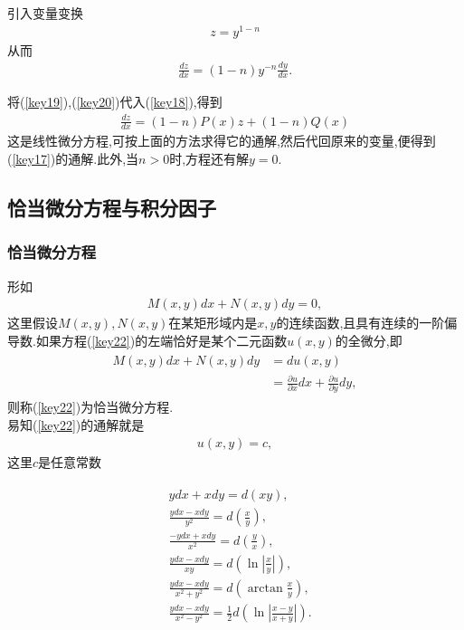 \documentclass[UTF8]{article}
\begin{document}
引入变量变换
\begin{align}\label{key19}
z=y^{1-n}
\end{align}
从而
\begin{align}\label{key20}
\frac{dz}{dx}=(1-n)y^{-n} \frac{dy}{dx}.
\end{align}

将(\ref{key19}),(\ref{key20})代入(\ref{key18}),得到
\begin{align}\label{key21}
\frac{dz}{dx}=(1-n)P(x)z+(1-n)Q(x)
\end{align}
这是线性微分方程,可按上面的方法求得它的通解,然后代回原来的变量,便得到(\ref{key17})的通解.此外,当$n>0$时,方程还有解$y=0$.

\subsection{恰当微分方程与积分因子}
\subsubsection{恰当微分方程}

形如
\begin{align}\label{key22}
M(x,y)dx+N(x,y)dy=0,
\end{align}
这里假设$M(x,y),N(x,y)$在某矩形域内是$x,y$的连续函数,且具有连续的一阶偏导数.如果方程(\ref{key22})的左端恰好是某个二元函数$u(x,y)$的全微分,即
\begin{align}\label{key23}
\begin{split}
M(x,y)dx+N(x,y)dy & =du(x,y)\\
& =\frac{\partial u}{\partial x}dx+\frac{\partial u}{\partial y}dy,
\end{split}
\end{align}
则称(\ref{key22})为恰当微分方程.\\
易知(\ref{key22})的通解就是
\begin{align}\label{key24}
u(x,y)=c,
\end{align}
这里$c$是任意常数

\begin{align}\label{key25}
\begin{split}
&ydx+xdy=d(xy),\\
&\frac{ydx-xdy}{y^2}=d(\frac{x}{y}),\\
&\frac{-ydx+xdy}{x^2}=d(\frac{y}{x}),\\
&\frac{ydx-xdy}{xy}=d(\ln{\left|\frac{x}{y}\right|}),\\
&\frac{ydx-xdy}{x^2+y^2}=d(\arctan{\frac{x}{y}}),\\
&\frac{ydx-xdy}{x^2-y^2}=\frac{1}{2}d(\ln{\left|\frac{x-y}{x+y}\right|}).
\end{split}
\end{align}
\end{document}
